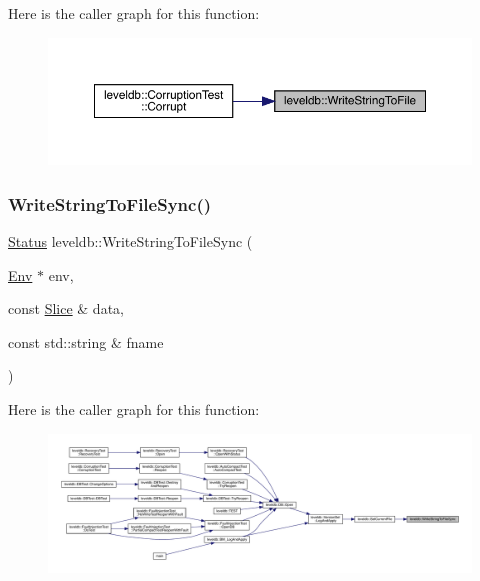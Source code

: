 Here is the caller graph for this function\+:
\nopagebreak
\begin{figure}[H]
\begin{center}
\leavevmode
\includegraphics[width=350pt]{namespaceleveldb_aa921f8824045bed5a75e2220a65bf68d_icgraph}
\end{center}
\end{figure}
\mbox{\label{namespaceleveldb_aaa2ccf468819a9d769dd0bf38674a6e9}} 
\subsubsection{\texorpdfstring{WriteStringToFileSync()}{WriteStringToFileSync()}}
{\footnotesize\ttfamily \mbox{\hyperlink{classleveldb_1_1_status}{Status}} leveldb\+::\+Write\+String\+To\+File\+Sync (\begin{DoxyParamCaption}\item[{\mbox{\hyperlink{classleveldb_1_1_env}{Env}} $\ast$}]{env,  }\item[{const \mbox{\hyperlink{classleveldb_1_1_slice}{Slice}} \&}]{data,  }\item[{const std\+::string \&}]{fname }\end{DoxyParamCaption})}

Here is the caller graph for this function\+:
\nopagebreak
\begin{figure}[H]
\begin{center}
\leavevmode
\includegraphics[width=350pt]{namespaceleveldb_aaa2ccf468819a9d769dd0bf38674a6e9_icgraph}
\end{center}
\end{figure}


